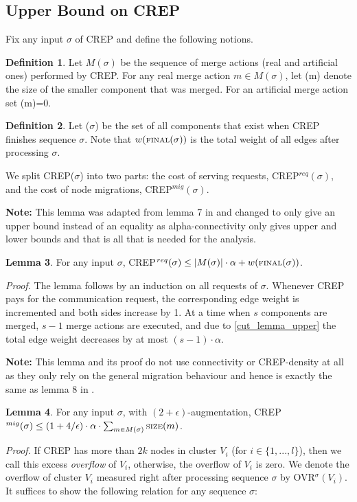 \documentclass[xcolor=dvipsnames, tikz, 12pt]{article}
\newcommand{\nl}{\newline}
\newcommand{\crep}{C{\scriptsize REP}}
\newcommand{\size}{\text{\scriptsize SIZE}}
\newcommand{\final}{\text{\scriptsize FINAL}}
\theoremstyle{definition}
\newtheorem{defi}{Definition}
\newtheorem{lemma}[defi]{Lemma}
\begin{document}
	\subsection{Upper Bound on \crep{}}
	Fix any input $\sigma$ of \crep{} and define the following notions.
	\begin{defi}
		Let $M(\sigma)$ be the sequence of merge actions (real and artificial ones) performed by \crep{}. For any real merge action $m\in M(\sigma)$, let \size(m) denote the size of the smaller component that was merged. For an artificial merge action set \size(m)=0.
	\end{defi}

\begin{defi}
	Let \final($\sigma$) be the set of all components that exist when \crep{} finishes sequence $\sigma$. Note that $w(\final(\sigma))$ is the total weight of all edges after processing $\sigma$.
\end{defi}

We split \crep{}($\sigma$) into two parts: the cost of serving requests, \crep{}$^{req}(\sigma)$, and the cost of node migrations, \crep{}$^{mig}(\sigma)$.\nl


\textbf{Note:} This lemma was adapted from lemma 7 in \cite{Avin2015} and changed to only give an upper bound instead of an equality as alpha-connectivity only gives upper and lower bounds and that is all that is needed for the analysis.
\begin{lemma}
	For any input $\sigma$, \crep{}$^{req}(\sigma)\leq|M(\sigma)|\cdot\alpha+w(\final(\sigma))$.
\end{lemma}
\textit{Proof.} The lemma follows by an induction on all requests of $\sigma$. Whenever \crep{} pays for the communication request, the corresponding edge weight is incremented and both sides increase by 1.
At a time when $s$ components are merged, $s-1$ merge actions are executed, and due to \cref{cut_lemma_upper} the total edge weight decreases by at most $(s-1)\cdot\alpha$.


\textbf{Note:} This lemma and its proof do not use connectivity or \crep{}-density at all as they only rely on the general migration behaviour and hence is exactly the same as lemma 8 in \cite{Avin2015}.
\begin{lemma}
	For any input $\sigma$, with $(2+\epsilon)$-augmentation, \crep{}$^{mig}(\sigma)\leq(1+4/\epsilon)\cdot\alpha\cdot\sum_{m\in M(\sigma)}\size(m)$.
\end{lemma}

\textit{Proof.} If \crep{} has more than $2k$ nodes in cluster $V_i$ (for $i\in\{1,...,l\}$), then we call this excess \textit{overflow} of $V_i$, otherwise, the overflow of $V_i$ is zero. We denote the overflow of cluster $V_i$ measured right after processing sequence $\sigma$ by OVR$^\sigma(V_i)$. It suffices to show the following relation for any sequence $\sigma$:
\end{document}
